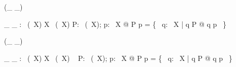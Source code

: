 \begin{zed}
     \leftassoc (\_ \dsetminus \_)
\end{zed}

\begin{gendef}[X]
    \_ \dsetminus \_ : \power~(\power~X) \cross \power X \fun \power~(\power~X)           
\where
    \forall P: \power~(\power~X); p: \power~X @ P \dsetminus p = \{~ q: \power~X | q \in P @ q \setminus p ~\}
\end{gendef}

\begin{zed}
     \leftassoc (\_ \dcap \_)
\end{zed}

\begin{gendef}[X]
    \_ \dcap \_ : \power~(\power~X) \cross \power X \fun \power~(\power~X)
\where
    \forall~ P: \power~(\power~X); p: \power~X @ P \dcap p = \{~ q: \power~X | q \in P @ q \cap p ~\}
\end{gendef}
